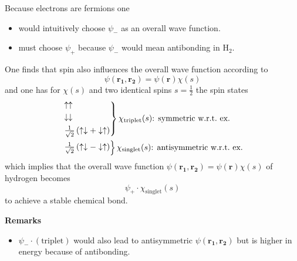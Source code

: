 
Because electrons are fermions one
\begin{itemize}
    \item would intuitively choose $\psi_{-}$ as an overall wave function.
    \item must choose $\psi_{+}$ because $\psi_{-}$ would mean antibonding in $\mathrm{H}_2$.
\end{itemize}
One finds that spin also influences the overall wave function according to
\begin{equation*}
    \psi(\mathbf{r_1},\mathbf{r_2})=\psi(\mathbf{r})\chi(s)
\end{equation*}
and one has for $\chi(s)$ and two identical spins $s=\frac{1}{2}$ the spin states
\begin{align*}
     & \begin{rcases}
           \uparrow \uparrow                                                        \\
           \downarrow \downarrow                                                    \\
           \frac{1}{\sqrt{2}}\left(\uparrow \downarrow + \downarrow \uparrow\right) \\
       \end{rcases} \chi_{\mathrm{triplet}}(s)\text{: symmetric w.r.t.\ ex.} \\
     & \begin{rcases}
           \frac{1}{\sqrt{2}}\left(\uparrow \downarrow - \downarrow \uparrow\right)
       \end{rcases} \chi_{\mathrm{singlet}}(s) \text{: antisymmetric w.r.t.\ ex.}
\end{align*}
which implies that the overall wave function $\psi(\mathbf{r_1},\mathbf{r_2})=\psi(\mathbf{r})\chi(s)$ of hydrogen becomes
\begin{equation*}
    \psi_{+}\cdot \chi_{\mathrm{singlet}}(s)
\end{equation*}
to achieve a stable chemical bond.

\newpar{}
\textbf{Remarks}
\begin{itemize}
    \item $\psi_{-}\cdot \left(\text{triplet}\right)$ would also lead to antisymmetric $\psi(\mathbf{r_1},\mathbf{r_2})$ but is higher in energy because of antibonding.
\end{itemize}

\newpar{}

